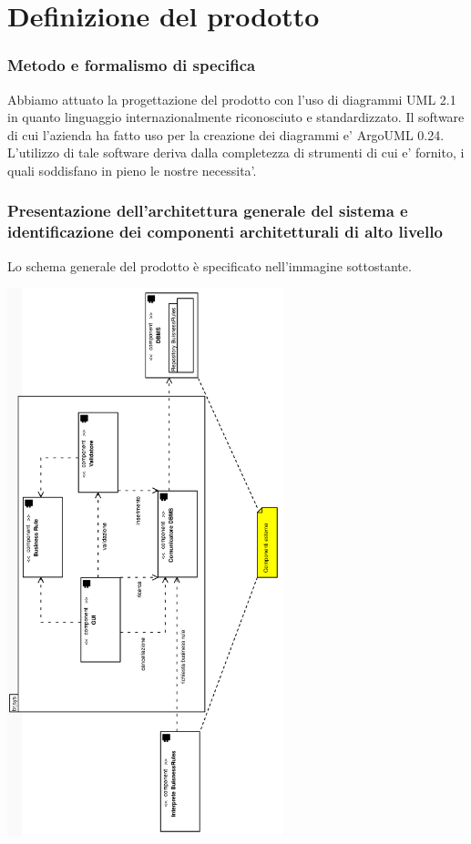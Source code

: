 \documentclass[11pt,titlepage,a4paper]{report}
\begin{document}
\chapter{Definizione del prodotto}
\subsection{Metodo e formalismo di specifica}
Abbiamo attuato la progettazione del prodotto con l'uso di diagrammi UML 2.1 in quanto linguaggio internazionalmente riconosciuto e standardizzato.
Il software di cui l’azienda ha fatto uso per la creazione dei diagrammi e' ArgoUML 0.24. L'utilizzo di tale software deriva dalla completezza
di strumenti di cui e' fornito, i quali soddisfano in pieno le nostre necessita'.

\subsection{Presentazione dell'architettura generale del sistema e identificazione dei componenti architetturali di alto livello}
Lo schema generale del prodotto è specificato nell'immagine sottostante.
\begin{center}
\includegraphics[width=0.6\textwidth, angle=-90]{DiagrammaClassi/schemagenerale.eps}
\end{center}
\end{document}
